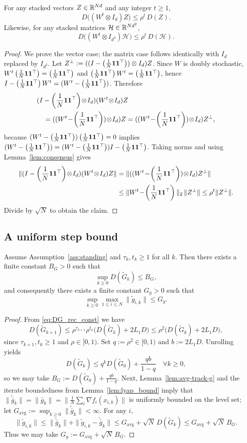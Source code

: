 \documentclass[review,onefignum,onetabnum]{siamart171218}
\begin{document}
\begin{lemma}\label{lem:mix_contract}
For any stacked vectors $Z\in\mathbb{R}^{Nd}$ and any integer $t\ge1$,
\[
D\big((W^t\otimes I_d)Z\big)\le \rho^t\,D(Z).
\]
Likewise, for any stacked matrices $\mathcal H\in\mathbb{R}^{Nd^2}$,
\[
D\big((W^t\otimes I_{d^2})\mathcal H\big)\le \rho^t\,D(\mathcal H).
\]
\end{lemma}
\begin{proof}
We prove the vector case; the matrix case follows identically with $I_d$ replaced by $I_{d^2}$.
Let $Z^\perp:=((I-\left(\frac{1}{N}\mathbf{1}\mathbf{1}^\top\right))\otimes I_d)Z$. Since $W$ is doubly stochastic, $W^t\left(\frac{1}{N}\mathbf{1}\mathbf{1}^\top\right)=\left(\frac{1}{N}\mathbf{1}\mathbf{1}^\top\right)$ and $\left(\frac{1}{N}\mathbf{1}\mathbf{1}^\top\right) W^t=\left(\frac{1}{N}\mathbf{1}\mathbf{1}^\top\right)$, hence
$I-\left(\frac{1}{N}\mathbf{1}\mathbf{1}^\top\right) W^t=(W^t-\left(\frac{1}{N}\mathbf{1}\mathbf{1}^\top\right))$. Therefore
\begin{align*}
&(\Pmat\!\otimes\! I_d)(W^t\!\otimes\! I_d)Z\\
&\quad=((W^t\!-\!\J)\!\otimes\! I_d)Z=((W^t\!-\!\J)\!\otimes\! I_d)Z^\perp,
\end{align*}
because $(W^t-\left(\frac{1}{N}\mathbf{1}\mathbf{1}^\top\right))\left(\frac{1}{N}\mathbf{1}\mathbf{1}^\top\right)=0$ implies $(W^t-\left(\frac{1}{N}\mathbf{1}\mathbf{1}^\top\right))=(W^t-\left(\frac{1}{N}\mathbf{1}\mathbf{1}^\top\right))I-\left(\frac{1}{N}\mathbf{1}\mathbf{1}^\top\right)$.
Taking norms and using Lemma~\ref{lem:consensus} gives
\begin{align*}
\|(\Pmat\!\otimes\! I_d)(W^t\!\otimes\! I_d)Z\|
&=\|((W^t\!-\!\J)\!\otimes\! I_d)Z^\perp\|\\
&\le \|W^t\!-\!\J\|_2\,\|Z^\perp\|
\le \rho^t\|Z^\perp\|.
\end{align*}
Divide by $\sqrt N$ to obtain the claim.
\end{proof}

\subsection{A uniform step bound}

\begin{lemma}\label{lem:tilde_track_bounded}
Assume Assumption~\ref{ass:standing} and $\tau_k,t_k\ge 1$ for all $k$.
Then there exists a finite constant $B_G>0$ such that
\[
\sup_{k\ge 0} D(\tilde G_k)\le B_G,
\]
and consequently there exists a finite constant $G_g>0$ such that
\[
\sup_{k\ge 0}\max_{1\le i\le N}\|\tilde g_{i,k}\|\le G_g.
\]
\end{lemma}
\begin{proof}
From \eqref{eq:DG_rec_const} we have
\[
D(\tilde G_{k+1})\le \rho^{\tau_{k+1}}\rho^{t_k}\big(D(\tilde G_k)+2L_1D\big)\le \rho^2\big(D(\tilde G_k)+2L_1D\big),
\]
since $\tau_{k+1},t_k\ge 1$ and $\rho\in[0,1)$.
Set $q:=\rho^2\in[0,1)$ and $b:=2L_1D$. Unrolling yields
\[
D(\tilde G_k)\le q^k D(\tilde G_0)+\frac{qb}{1-q}\quad\forall k\ge 0,
\]
so we may take $B_G:=D(\tilde G_0)+\frac{qb}{1-q}$.
Next, Lemma~\ref{lem:avg-track-g} and the iterate boundedness from Lemma~\ref{lem:lyap_bound} imply that
$\|\tilde{\bar g}_k\|=\|\bar g_k\|=\big\|\frac1N\sum_i \nabla f_i(x_{i,k})\big\|$ is uniformly bounded on the level set;
let $G_{\mathrm{avg}}:=\sup_{k\ge 0}\|\tilde{\bar g}_k\|<\infty$.
For any $i$,
\[
\|\tilde g_{i,k}\|\le \|\tilde{\bar g}_k\|+\|\tilde g_{i,k}-\tilde{\bar g}_k\|
\le G_{\mathrm{avg}}+\sqrt N\,D(\tilde G_k)\le G_{\mathrm{avg}}+\sqrt N\,B_G.
\]
Thus we may take $G_g:=G_{\mathrm{avg}}+\sqrt N\,B_G$.
\end{proof}
\end{document}
